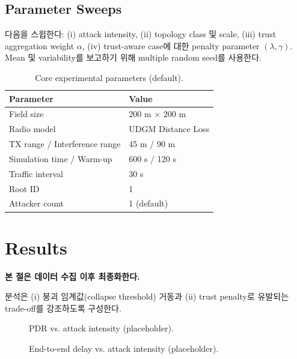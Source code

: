 \documentclass[11pt,a4paper]{article}
\begin{document}
\subsection{Parameter Sweeps}
다음을 스윕한다:
(i) attack intensity,
(ii) topology class 및 scale,
(iii) trust aggregation weight $\alpha$,
(iv) trust-aware case에 대한 penalty parameter $(\lambda,\gamma)$.
Mean 및 variability를 보고하기 위해 multiple random seed를 사용한다.

\begin{table}[t]
\centering
\caption{Core experimental parameters (default).}
\label{tab:params}
\begin{tabular}{ll}
\toprule
Parameter & Value \\
\midrule
Field size & 200 m $\times$ 200 m \\
Radio model & UDGM Distance Loss \\
TX range / Interference range & 45 m / 90 m \\
Simulation time / Warm-up & 600 s / 120 s \\
Traffic interval & 30 s \\
Root ID & 1 \\
Attacker count & 1 (default) \\
\bottomrule
\end{tabular}
\end{table}

\section{Results}
\label{sec:results}

\noindent\textbf{본 절은 데이터 수집 이후 최종화한다.}

분석은 (i) 붕괴 임계값(collapse threshold) 거동과 (ii) trust penalty로 유발되는 trade-off를 강조하도록 구성한다.

\begin{figure}[t]
  \centering
  \caption{PDR vs. attack intensity (placeholder).}
  \label{fig:pdr}
\end{figure}

\begin{figure}[t]
  \centering
  \caption{End-to-end delay vs. attack intensity (placeholder).}
  \label{fig:delay}
\end{figure}
\end{document}
